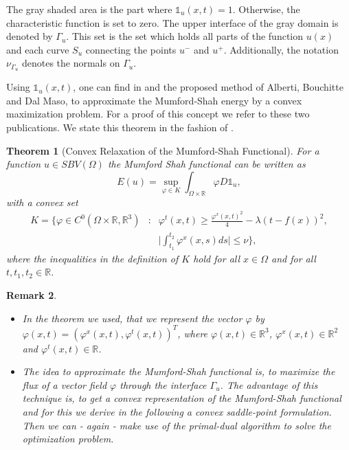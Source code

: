 \documentclass{scrreprt}
\newtheorem{theorem}{Theorem}[chapter]
\newtheorem{remark}[theorem]{Remark}
\begin{document}
        The gray shaded area is the part where $\mathds{1}_{u}(x, t) = 1$. Otherwise, the characteristic function is set to zero. The upper interface of the gray domain is denoted by $\Gamma_{u}$. This set is the set which holds all parts of the function $u(x)$ and each curve $S_{u}$ connecting the points $u^{-}$ and $u^{+}$. Additionally, the notation $\nu_{\Gamma_{u}}$ denotes the normals on $\Gamma_{u}$.

        Using $\mathds{1}_{u}(x, t)$, one can find in \cite{Alberti-et-al-lnss} and \cite{Alberti-et-al-cvpde} the proposed method of Alberti, Bouchitte and Dal Maso, to approximate the Mumford-Shah energy by a convex maximization problem. For a proof of this concept we refer to these two publications. We state this theorem in the fashion of \cite{Pock-et-al-iccv09}.

        \begin{theorem}[Convex Relaxation of the Mumford-Shah Functional]
        \label{convex_relaxation_of_the_mumford_shah_functional}
            For a function $u \in SBV(\Omega)$ the Mumford Shah functional can be written as
                \begin{equation}
                    E(u) = \sup_{\varphi \in K} \int_{\Omega \times \mathbb{R}} \varphi D\mathds{1}_{u}, \label{eq:convex_relaxed_ms}
                \end{equation}
            with a convex set
                \begin{eqnarray}
                    K = \bigg\{ \varphi \in C^{0}(\Omega \times \mathbb{R}, \mathbb{R}^{3}) &:& \varphi^{t}(x, t) \ge \frac{\varphi^{x}(x,t)^{2}}{4} - \lambda(t - f(x))^{2}, \\
                    &&\bigg| \int^{t_{2}}_{t_{1}} \varphi^{x}(x,s)ds \bigg| \le \nu \bigg\}, \label{eq:set_k_continuous}
                \end{eqnarray}
            where the inequalities in the definition of $K$ hold for all $x \in \Omega$ and for all $t, t_{1}, t_{2} \in \mathbb{R}$.
        \end{theorem}

        \begin{remark}
            \begin{itemize}
                \item In the theorem we used, that we represent the vector $\varphi$ by $\varphi(x, t) = \left( \varphi^{x}(x,t), \varphi^{t}(x,t) \right)^{T}$, where $\varphi(x,t) \in \mathbb{R}^{3}$, $\varphi^{x}(x,t) \in \mathbb{R}^{2}$ and $\varphi^{t}(x,t) \in \mathbb{R}$.
                \item The idea to approximate the Mumford-Shah functional is, to maximize the flux of a vector field $\varphi$ through the interface $\Gamma_{u}$. The advantage of this technique is, to get a convex representation of the Mumford-Shah functional and for this we derive in the following a convex saddle-point formulation. Then we can - again - make use of the primal-dual algorithm to solve the optimization problem.
            \end{itemize}
        \end{remark}
\end{document}
